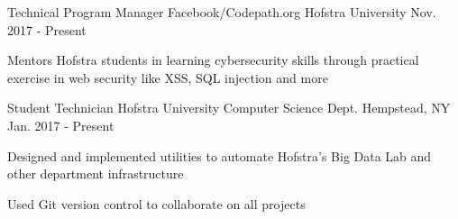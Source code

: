 

\begin{cventries}

\cventry
    {Technical Program Manager} %
    {Facebook/Codepath.org} %
    {Hofstra University} %
    {Nov. 2017 - Present} %
    {
      \begin{cvitems} %
        \item {Mentors Hofstra students in learning cybersecurity skills through practical exercise in web security like XSS, SQL injection and more}
      \end{cvitems}
    }

  \cventry
    {Student Technician} %
    {Hofstra University Computer Science Dept.} %
    {Hempstead, NY} %
    {Jan. 2017 - Present} %
    {
      \begin{cvitems} %
        \item {Designed and implemented utilities to automate Hofstra's Big Data Lab and other department infrastructure}
        \item {Used Git version control to collaborate on all projects}
      \end{cvitems}
    }

\end{cventries}
